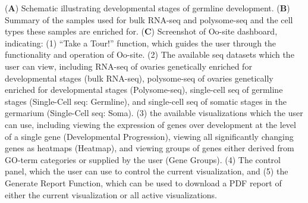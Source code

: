 \documentclass[12pt,oneside]{reedthesis}
\begin{document}
\setlength\parindent{0pt}(\textbf{A}) Schematic illustrating developmental stages of germline development. (\textbf{B}) Summary of the samples used for bulk RNA-seq and polysome-seq and the cell types these samples are enriched for. (\textbf{C}) Screenshot of Oo-site dashboard, indicating: (1) ``Take a Tour!'' function, which guides the user through the functionality and operation of Oo-site. (2) The available seq datasets which the user can view, including RNA-seq of ovaries genetically enriched for developmental stages (bulk RNA-seq), polysome-seq of ovaries genetically enriched for developmental stages (Polysome-seq), single-cell seq of germline stages (Single-Cell seq: Germline), and single-cell seq of somatic stages in the germarium (Single-Cell seq: Soma). (3) the available visualizations which the user can use, including viewing the expression of genes over development at the level of a single gene (Developmental Progression), viewing all significantly changing genes as heatmaps (Heatmap), and viewing groups of genes either derived from GO-term categories or supplied by the user (Gene Groups). (4) The control panel, which the user can use to control the current visualization, and (5) the Generate Report Function, which can be used to download a PDF report of either the current visualization or all active visualizations.

\end{document}
